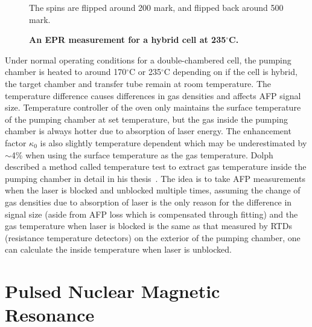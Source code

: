 \begin{figure}[t!]
	\centering
	\caption{{\bf An EPR measurement for a hybrid cell at 235$^{\circ}$C.}} The spins are flipped around 200 mark, and flipped back around 500 mark.
	\label{epr}
\end{figure}

Under normal operating conditions for a double-chambered cell, the pumping chamber is heated to around 170$^{\circ}$C or 235$^{\circ}$C depending on if the cell is hybrid, the target chamber and transfer tube remain at room temperature. The temperature difference causes differences in gas densities and affects AFP signal size. Temperature controller of the oven only maintains the surface temperature of the pumping chamber at set temperature, but the gas inside the pumping chamber is always hotter due to absorption of laser energy. The enhancement factor $\kappa_{0}$ is also slightly temperature dependent which may be underestimated by $\sim$4\% when using the surface temperature as the gas temperature. Dolph described a method called temperature test to extract gas temperature inside the pumping chamber in detail in his thesis~\cite{PeterThesis}. The idea is to take AFP measurements when the laser is blocked and unblocked multiple times, assuming the change of gas densities due to absorption of laser is the only reason for the difference in signal size (aside from AFP loss which is compensated through fitting) and the gas temperature when laser is blocked is the same as that measured by RTDs (resistance temperature detectors) on the exterior of the pumping chamber, one can calculate the inside temperature when laser is unblocked. 

\section{Pulsed Nuclear Magnetic Resonance} 

